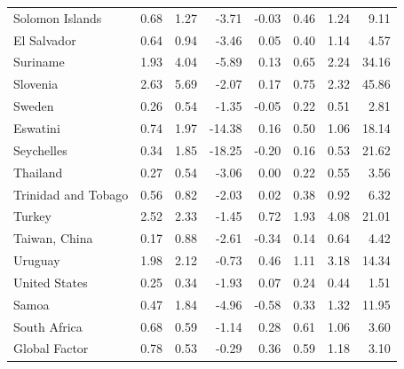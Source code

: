 \begin{tabular}{lrrrrrrr}
Solomon Islands & 0.68 & 1.27 & -3.71 & -0.03 & 0.46 & 1.24 & 9.11 \\
El Salvador & 0.64 & 0.94 & -3.46 & 0.05 & 0.40 & 1.14 & 4.57 \\
Suriname & 1.93 & 4.04 & -5.89 & 0.13 & 0.65 & 2.24 & 34.16 \\
Slovenia & 2.63 & 5.69 & -2.07 & 0.17 & 0.75 & 2.32 & 45.86 \\
Sweden & 0.26 & 0.54 & -1.35 & -0.05 & 0.22 & 0.51 & 2.81 \\
Eswatini & 0.74 & 1.97 & -14.38 & 0.16 & 0.50 & 1.06 & 18.14 \\
Seychelles & 0.34 & 1.85 & -18.25 & -0.20 & 0.16 & 0.53 & 21.62 \\
Thailand & 0.27 & 0.54 & -3.06 & 0.00 & 0.22 & 0.55 & 3.56 \\
Trinidad and Tobago & 0.56 & 0.82 & -2.03 & 0.02 & 0.38 & 0.92 & 6.32 \\
Turkey & 2.52 & 2.33 & -1.45 & 0.72 & 1.93 & 4.08 & 21.01 \\
Taiwan, China & 0.17 & 0.88 & -2.61 & -0.34 & 0.14 & 0.64 & 4.42 \\
Uruguay & 1.98 & 2.12 & -0.73 & 0.46 & 1.11 & 3.18 & 14.34 \\
United States & 0.25 & 0.34 & -1.93 & 0.07 & 0.24 & 0.44 & 1.51 \\
Samoa & 0.47 & 1.84 & -4.96 & -0.58 & 0.33 & 1.32 & 11.95 \\
South Africa & 0.68 & 0.59 & -1.14 & 0.28 & 0.61 & 1.06 & 3.60 \\
Global Factor & 0.78 & 0.53 & -0.29 & 0.36 & 0.59 & 1.18 & 3.10 \\
\bottomrule
\end{tabular}
